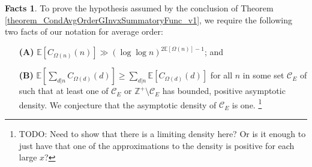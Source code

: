 \documentclass[11pt,reqno,a4letter]{article}
\numberwithin{figure}{section}
\numberwithin{table}{section}
\theoremstyle{plain}
\numberwithin{theorem}{section}
\theoremstyle{definition}
\newtheorem{facts}[theorem]{Facts}
\begin{document}
\begin{facts} 
To prove the hypothesis assumed by the conclusion of 
Theorem \ref{theorem_CondAvgOrderGInvxSummatoryFunc_v1}, 
we require the following two facts of our notation for average order: 
\begin{itemize} 
     \item[\textbf{(A)}] $\mathbb{E}[C_{\Omega(n)}(n)] \gg (\log\log n)^{2\mathbb{E}[\Omega(n)]-1}$; and 
     \item[\textbf{(B)}] $\mathbb{E}\left[\sum_{d|n} C_{\Omega(d)}(d)\right] \geq \sum_{d|n} \mathbb{E}[C_{\Omega(d)}(d)]$ 
     for all $n$ in some set $\mathcal{C}_E$ of such that at least one of 
     $\mathcal{C}_E$ or $\mathbb{Z}^{+} \setminus \mathcal{C}_E$ has 
     bounded, positive asymptotic density. We conjecture that the asymptotic density of 
     $\mathcal{C}_E$ is one. \footnote{ 
          TODO: Need to show that there is a limiting density here? Or is it enough to just have that one of the 
          approximations to the density is positive for each large $x$? 
     }
\end{itemize} 
\end{facts} 
\end{document}
